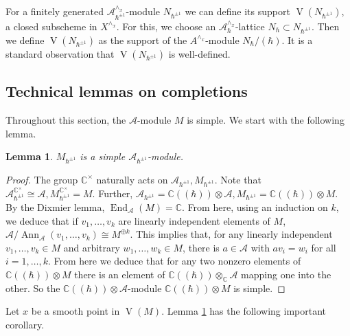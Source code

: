 \documentclass[12pt]{amsart}
\newcommand{\A}{\mathcal{A}}
\newcommand{\K}{\mathbb{C}}
\newcommand{\VA}{\operatorname{V}}
\newcommand{\C}{\mathbb{C}}
\newtheorem{Lem}[Thm]{Lemma}
\theoremstyle{definition}
\begin{document}
For a finitely generated $\A_{\hbar^{\pm 1}}^{\wedge_x}$-module $N_{\hbar^{\pm 1}}$ we can define its support
$\VA(N_{\hbar^{\pm 1}})$, a closed subscheme in $X^{\wedge_x}$. For this, we choose
an $\A_\hbar^{\wedge_x}$-lattice $N_\hbar\subset N_{\hbar^{\pm 1}}$. Then we define
$\VA(N_{\hbar^{\pm 1}})$ as the support of the $A^{\wedge_x}$-module $N_{\hbar}/(\hbar)$.
It is a standard observation that $\VA(N_{\hbar^{\pm 1}})$ is well-defined.

\subsection{Technical lemmas on completions}
Throughout this section, the $\A$-module $M$ is simple.
We start with the following lemma.

\begin{Lem}\label{Lem:simplicity}
$M_{\hbar^{\pm 1}}$ is a simple
$\A_{\hbar^{\pm 1}}$-module.
\end{Lem}
\begin{proof}
 The group $\K^\times$ naturally
acts on $\A_{\hbar^{\pm 1}}, M_{\hbar^{\pm 1}}$. Note that $\A_{\hbar^{\pm 1}}^{\K^\times}\cong \A, M_{\hbar^{\pm 1}}^{\K^\times}=M$. Further, $\A_{\hbar^{\pm 1}}=\K((\hbar))\otimes \A, M_{\hbar^{\pm 1}}=\K((\hbar))\otimes M$.
By the Dixmier lemma, $\operatorname{End}_{\A}(M)=\C$. From here, using an induction on $k$,
we deduce that if $v_1,\ldots,v_k$ are linearly independent elements of $M$,  $\A/\operatorname{Ann}_{\A}(v_1,\ldots,v_k)\cong M^{\oplus k}$. This implies that, for any linearly
independent $v_1,\ldots,v_k\in M$ and arbitrary $w_1,\ldots,w_k\in M$, there is $a\in \A$
with $av_i=w_i$ for all $i=1,\ldots,k$. From here we deduce that for any two nonzero elements of
$\K((\hbar))\otimes M$ there is an element of $\K((\hbar))\otimes_{\K}\A$ mapping one into the other.
So the $\K((\hbar))\otimes \A$-module $\K((\hbar))\otimes M$ is simple.
\end{proof}

Let $x$ be a smooth point in $\VA(M)$.
Lemma \ref{Lem:simplicity} has the following important corollary.
\end{document}
